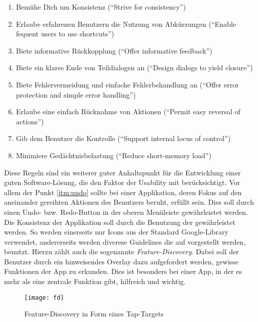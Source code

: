 \begin{enumerate}
	\item Bemühe Dich um Konsistenz (``Strive for consistency'')
	\item Erlaube erfahrenen Benutzern die Nutzung von Abkürzungen (``Enable fequent users to use shortcuts'')
	\item Biete informative Rückkopplung (``Offer informative feedback'')
	\item Biete ein klares Ende von Teildialogen an (``Design dialogs to yield closure'')
	\item Biete Fehlervermeidung und einfache Fehlerbehandlung an (``Offer error protection and simple error handling'')
  \item \label{itm:undo} Erlaube eine einfach Rücknahme von Aktionen (``Permit easy reversal of actions'')
	\item Gib dem Benutzer die Kontrolle (``Support internal locus of control'')
	\item Minimiere Gedächtnisbelastung (``Reduce short-memory load'')
\end{enumerate} 

Diese Regeln sind ein weiterer guter Anhaltspunkt für die Entwicklung einer guten Software-Lösung, die den Faktor der Usability mit berücksichtigt. Vor allem der Punkt \autoref{itm:undo} sollte bei einer Applikation, deren Fokus auf den aneinander gereihten Aktionen des Benutzers beruht, erfüllt sein. Dies soll durch einen Undo- bzw. Redo-Button in der oberen Menüleiste gewährleistet werden. \\

Die Konsistenz der Applikation soll durch die Benutzung der \citet{AndroidMG} gewährleistet werden. 
So werden einerseits nur Icons aus der Standard Google-Library verwendet, andererseits werden diverese Guidelines die auf \citet{AndroidMG} vorgestellt werden, benutzt. 
Hierzu zählt auch die sogenannte \emph{Feature-Discovery}.
Dabei soll der Benutzer durch ein hinweisendes Overlay dazu aufgefordert werden, gewisse Funktionen der App zu erkunden. 
Dies ist besonders bei einer App, in der es mehr als eine zentrale Funktion gibt, hilfreich und wichtig. \\

\begin{figure}[h]
    \centering
    \texttt{[image: fd]}
    \caption{Feature-Discovery in Form eines Tap-Targets}
    \label{fig:fd}
\end{figure}

